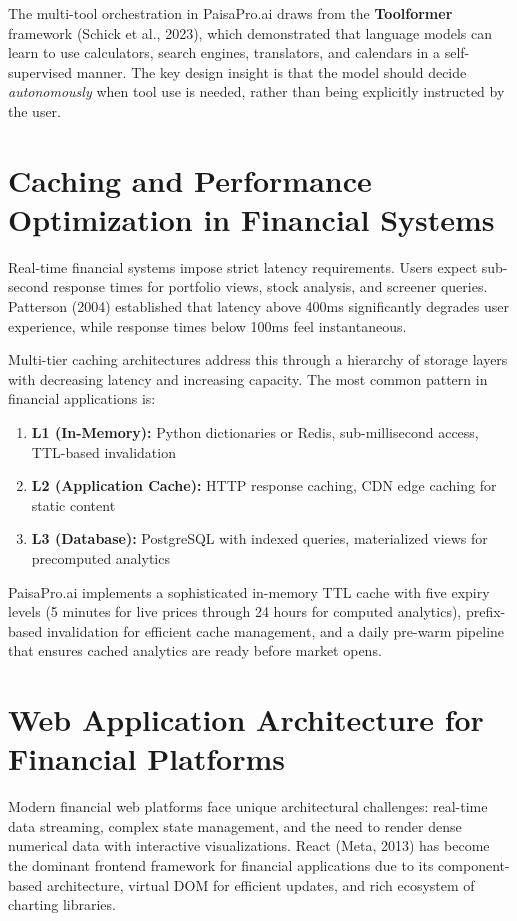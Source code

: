 \documentclass[12pt, a4paper, oneside]{report}
\newcommand{\projectname}{PaisaPro.ai}
\begin{document}
The multi-tool orchestration in \projectname{} draws from the \textbf{Toolformer} framework (Schick et al., 2023), which demonstrated that language models can learn to use calculators, search engines, translators, and calendars in a self-supervised manner. The key design insight is that the model should decide \textit{autonomously} when tool use is needed, rather than being explicitly instructed by the user.

\section{Caching and Performance Optimization in Financial Systems}
\label{sec:lit_caching}

Real-time financial systems impose strict latency requirements. Users expect sub-second response times for portfolio views, stock analysis, and screener queries. Patterson (2004) established that latency above 400ms significantly degrades user experience, while response times below 100ms feel instantaneous.

Multi-tier caching architectures address this through a hierarchy of storage layers with decreasing latency and increasing capacity. The most common pattern in financial applications is:
\begin{enumerate}[nosep]
    \item \textbf{L1 (In-Memory):} Python dictionaries or Redis, sub-millisecond access, TTL-based invalidation
    \item \textbf{L2 (Application Cache):} HTTP response caching, CDN edge caching for static content
    \item \textbf{L3 (Database):} PostgreSQL with indexed queries, materialized views for precomputed analytics
\end{enumerate}

\projectname{} implements a sophisticated in-memory TTL cache with five expiry levels (5 minutes for live prices through 24 hours for computed analytics), prefix-based invalidation for efficient cache management, and a daily pre-warm pipeline that ensures cached analytics are ready before market opens.

\section{Web Application Architecture for Financial Platforms}
\label{sec:lit_webarch}

Modern financial web platforms face unique architectural challenges: real-time data streaming, complex state management, and the need to render dense numerical data with interactive visualizations. React (Meta, 2013) has become the dominant frontend framework for financial applications due to its component-based architecture, virtual DOM for efficient updates, and rich ecosystem of charting libraries.
\end{document}

